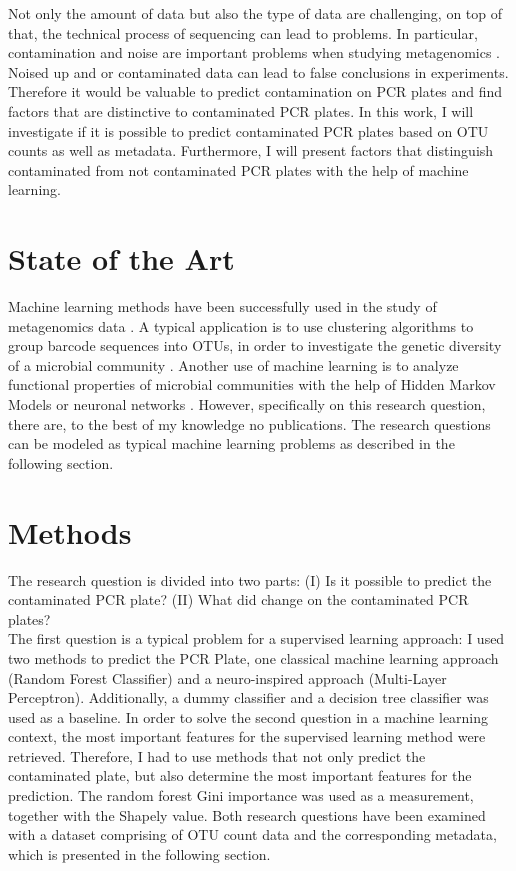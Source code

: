 \documentclass{svproc}
\begin{document}
Not only the amount of data but also the type of data are challenging, on top of that, the technical process of sequencing can lead to problems.
In particular, contamination and noise are important problems when studying metagenomics \cite{eisenhofer2019contamination}. Noised up and or contaminated data can lead to false conclusions in experiments. Therefore it would be valuable to predict contamination on PCR plates and find factors that are distinctive to contaminated PCR plates. In this work, I will investigate if it is possible to predict contaminated PCR plates based on OTU counts as well as metadata. Furthermore, I will present factors that distinguish contaminated from not contaminated PCR plates with the help of machine learning.


\section{State of the Art}
Machine learning methods have been successfully used in the study of metagenomics data  \cite{Soueidan2017}. A typical application is to use clustering algorithms to group barcode sequences into OTUs, in order to investigate the genetic diversity of a microbial community \cite{Soueidan2017}. Another use of machine learning is to analyze functional properties of microbial communities with the help of Hidden Markov Models or neuronal networks \cite{Soueidan2017}. However, specifically on this research question, there are, to the best of my knowledge no publications. The research questions can be modeled as typical machine learning problems as described in the following section.

%
%
\section{Methods}

The research question is divided into two parts: (I) Is it possible to predict the contaminated PCR plate? (II) What did change on the contaminated PCR plates? \\
The first question is a typical problem for a supervised learning approach: I used two methods to predict the PCR Plate, one classical machine learning approach (Random Forest Classifier) and a neuro-inspired approach (Multi-Layer Perceptron).  Additionally, a dummy classifier and a decision tree classifier was used as a baseline.
In order to solve the second question in a machine learning context, the most important features for the supervised learning method were retrieved. Therefore, I had to use methods that not only predict the contaminated plate, but also determine the most important features for the prediction. The random forest Gini importance was used as a measurement, together with the Shapely value.
Both research questions have been examined with a dataset comprising of OTU count data and the corresponding metadata, which is presented in the following section.\\
\end{document}
